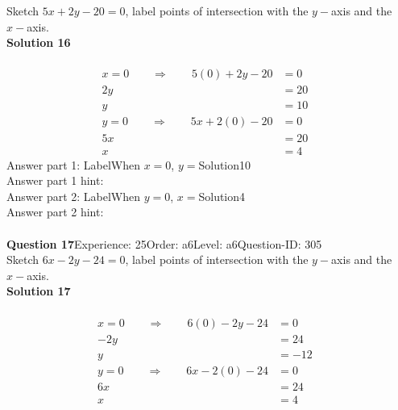 \documentclass{article}
\begin{document}
Sketch $5x+2y-20=0$, label points of intersection with the $y-$axis and the $x-$axis.\\[4pt]
\noindent\textbf{Solution 16}\\[2pt]
\\[-35pt]\begin{align*}
x=0\qquad\Rightarrow\qquad 5(0)+2y-20&=0&\\[2pt]
2y&=20\\[2pt]
y&=10\\[12pt]
y=0\qquad\Rightarrow\qquad 5x+2(0)-20&=0&\\[2pt]
5x&=20\\[2pt]
x&=4
\end{align*}
Answer part 1: \hspace{10pt}Label\hspace{10pt}When $x=0$, $y=$\hspace{10pt}Solution\hspace{10pt}10\\
Answer part 1 hint: \hspace{15pt}\\
Answer part 2: \hspace{10pt}Label\hspace{10pt}When $y=0$, $x=$\hspace{10pt}Solution\hspace{10pt}4\\
Answer part 2 hint: \hspace{15pt}\\
\\[4pt]
\noindent\textbf{Question 17}\hspace{20pt}Experience: 25\hspace{20pt}Order: a6\hspace{20pt}Level: a6\hspace{20pt}Question-ID: 305\\[2pt]
Sketch $6x-2y-24=0$, label points of intersection with the $y-$axis and the $x-$axis.\\[4pt]
\noindent\textbf{Solution 17}\\[2pt]
\\[-35pt]\begin{align*}
x=0\qquad\Rightarrow\qquad 6(0)-2y-24&=0&\\[2pt]
-2y&=24\\[2pt]
y&=-12\\[12pt]
y=0\qquad\Rightarrow\qquad 6x-2(0)-24&=0&\\[2pt]
6x&=24\\[2pt]
x&=4
\end{align*}
\end{document}
